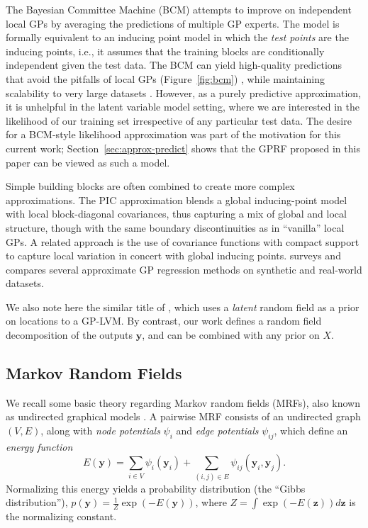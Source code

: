 \documentclass{article}
\renewcommand{\v}[1]{\mathbf{#1}}
\begin{document}
The Bayesian Committee Machine (BCM) \cite{tresp2000bayesian} attempts
to improve on independent local GPs by averaging the predictions of
multiple GP experts. The model is formally equivalent to an inducing point model
in which the {\em test points} are the inducing points, i.e., it
assumes that the training blocks are conditionally independent given
the test data. The BCM can yield high-quality predictions that avoid the
pitfalls of local GPs (Figure~\ref{fig:bcm})
\cite{schwaighofer2002transductive}, while maintaining scalability to
very large datasets \cite{deisenroth2015distributed}. However, as a
purely predictive approximation, it is unhelpful in the latent
variable model setting, where we are interested in the likelihood of
our training set irrespective of any particular test data.  The desire
for a BCM-style likelihood approximation was part of the motivation
for this current work; Section~\ref{sec:approx-predict} shows that the GPRF
proposed in this paper can be viewed as such a model. 

Simple building blocks are often combined to create more complex
approximations. 
The PIC approximation \cite{snelson2007} blends a global
inducing-point model with local block-diagonal covariances, 
thus capturing a mix of global and local
structure, though with the same boundary discontinuities as in
``vanilla'' local GPs. A related approach is the use of covariance
functions with compact support \cite{vanhatalo2008} to capture local
variation in concert with global inducing points. \cite{chalupka2012} surveys and compares
several approximate GP regression methods on synthetic and real-world
datasets. 

We also note here the similar title of \cite{zhong2010gaussian}, which uses a {\em
  latent} random field as a prior on locations to a GP-LVM. By
contrast, our work defines a random field decomposition of the outputs
$\v{y}$, and can be combined with any prior on $X$. 

\subsection{Markov Random Fields}

We recall some basic theory regarding Markov random fields
(MRFs), also known as undirected graphical models \cite{koller2009probabilistic}. A pairwise
MRF consists of an undirected graph $(V, E)$, along with {\em node potentials} $\psi_i$ and {\em edge
potentials} $\psi_{ij}$, which define an {\em energy function} 
\begin{equation}
E(\v{y}) = \sum_{i\in V} \psi_{i}(\v{y}_i) + \sum_{(i,j)\in E}
\psi_{ij}(\v{y}_i, \v{y}_j).\label{eqn:mrf}
\end{equation}
Normalizing this energy yields a probability distribution (the ``Gibbs
distribution''), $p(\v{y}) = \frac{1}{Z}\exp(-E(\v{y}))$, where $Z = \int \exp(-E(\v{z})) d\v{z}$ is the normalizing constant. 
\end{document}
